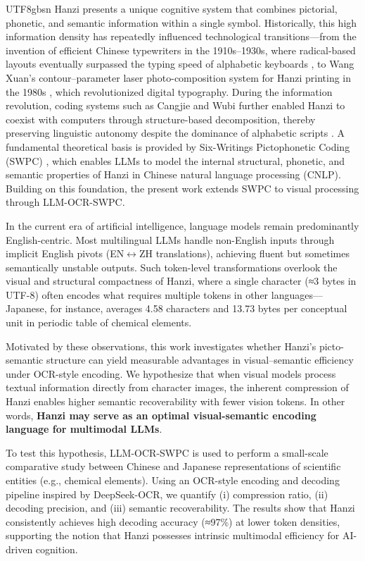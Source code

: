 \documentclass[conference]{IEEEtran}
\begin{document}
\begin{CJK*}{UTF8}{gbsn}
Hanzi presents a unique cognitive system that combines pictorial, phonetic, and semantic information within a single symbol. Historically, this high information density has repeatedly influenced technological transitions—from the invention of efficient Chinese typewriters in the 1910s–1930s, where radical-based layouts eventually surpassed the typing speed of alphabetic keyboards \cite{mullaney2017chinese,weigang2022typewriter}, to Wang Xuan’s contour–parameter laser photo-composition system for Hanzi printing in the 1980s \cite{wangxuan1997}, which revolutionized digital typography. During the information revolution, coding systems such as Cangjie and Wubi further enabled Hanzi to coexist with computers through structure-based decomposition, thereby preserving linguistic autonomy despite the dominance of alphabetic scripts \cite{sun2021chinesebert,weigang2025threshold}.  A fundamental theoretical basis is provided by Six-Writings Pictophonetic Coding (SWPC) \cite{weigang2024six}, which enables LLMs to model the internal structural, phonetic, and semantic properties of Hanzi in Chinese natural language processing (CNLP). Building on this foundation, the present work extends SWPC to visual processing through LLM-OCR-SWPC.

In the current era of artificial intelligence, language models remain predominantly English-centric. Most multilingual LLMs handle non-English inputs through implicit English pivots (EN$\leftrightarrow$ZH translations), achieving fluent but sometimes semantically unstable outputs. Such token-level transformations overlook the visual and structural compactness of Hanzi, where a single character (≈3 bytes in UTF-8) often encodes what requires multiple tokens in other languages—Japanese, for instance, averages 4.58 characters and 13.73 bytes per conceptual unit in periodic table of chemical elements.

Motivated by these observations, this work investigates whether Hanzi’s picto-semantic structure can yield measurable advantages in visual–semantic efficiency under OCR-style encoding. We hypothesize that when visual models process textual information directly from character images, the inherent compression of Hanzi enables higher semantic recoverability with fewer vision tokens. In other words, \textbf{Hanzi may serve as an optimal visual-semantic encoding language for multimodal LLMs}.

To test this hypothesis, LLM-OCR-SWPC is used to perform a small-scale comparative study between Chinese and Japanese representations of scientific entities (e.g., chemical elements). Using an OCR-style encoding and decoding pipeline inspired by DeepSeek-OCR, we quantify (i) compression ratio, (ii) decoding precision, and (iii) semantic recoverability. The results show that Hanzi consistently achieves high decoding accuracy (≈97\%) at lower token densities, supporting the notion that Hanzi possesses intrinsic multimodal efficiency for AI-driven cognition.


\end{CJK*}
\end{document}
